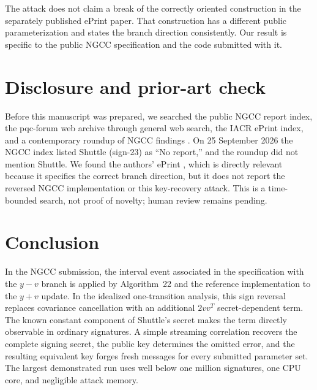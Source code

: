 \documentclass[11pt,a4paper]{article}
\begin{document}
The attack does not claim a break of the correctly oriented construction in
the separately published ePrint paper.  That construction has a different
public parameterization and states the branch direction consistently.  Our
result is specific to the public NGCC specification and the code submitted
with it.

\section{Disclosure and prior-art check}

Before this manuscript was prepared, we searched the public NGCC report index,
the pqc-forum web archive through general web search, the IACR ePrint index,
and a contemporary roundup of NGCC findings \cite{NGCCReports,Roundup}.  On 25
September 2026 the NGCC index listed Shuttle (sign-23) as ``No report,'' and
the roundup did not mention Shuttle.  We found the authors' ePrint
\cite{MingEtAl}, which is directly relevant because it specifies the correct
branch direction, but it does not report the reversed NGCC implementation or
this key-recovery attack.  This is a time-bounded search, not proof of novelty;
human review remains pending.

\section{Conclusion}

In the NGCC submission, the interval event associated in the specification
with the $y-v$ branch is applied by Algorithm~22 and the reference
implementation to the $y+v$ update.  In the idealized one-transition analysis,
this sign reversal replaces covariance cancellation with an additional
$2vv^T$ secret-dependent term.  The known constant component of Shuttle's
secret makes the term directly observable in ordinary signatures.  A simple
streaming correlation recovers the complete signing secret, the public key
determines the omitted error, and the resulting equivalent key forges fresh
messages for every submitted parameter set.  The largest demonstrated run
uses well below one million signatures, one CPU core, and negligible attack
memory.
\end{document}
